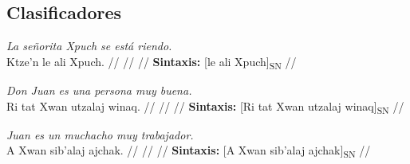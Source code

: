 \documentclass{article}%
\begin{document}
\subsection{Clasificadores}%
\label{subsec:Clasificadores}%

%
\par\medskip%
\ex
\textit{La señorita Xpuch se está riendo.} \\
\begingl
\gla Ktze'n le ali Xpuch. //
\glb  //
\glc  //
\glft \textbf{Sintaxis:} [le ali Xpuch]\textsubscript{SN} //
\endgl
\xe
%
\medskip%
\par\medskip%
\ex
\textit{Don Juan es una persona muy buena.} \\
\begingl
\gla Ri tat Xwan utzalaj winaq. //
\glb  //
\glc  //
\glft \textbf{Sintaxis:} [Ri tat Xwan utzalaj winaq]\textsubscript{SN} //
\endgl
\xe
%
\medskip%
\par\medskip%
\ex
\textit{Juan es un muchacho muy trabajador.} \\
\begingl
\gla A Xwan sib'alaj ajchak. //
\glb  //
\glc  //
\glft \textbf{Sintaxis:} [A Xwan sib'alaj ajchak]\textsubscript{SN} //
\endgl
\xe
%
\medskip

%
\end{document}
